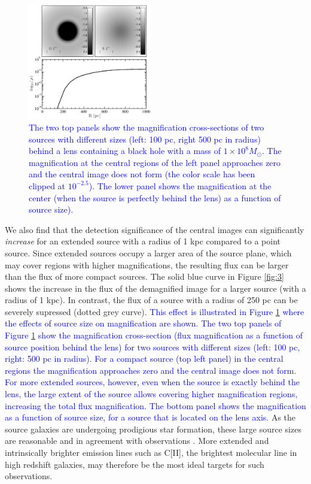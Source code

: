 \documentclass[chicago]{emulateapj}
\newcommand{\blue}{\textcolor{blue}}
\begin{document}
\begin{figure}
\begin{center}
\centering
\includegraphics[trim= 0 0 0 0, clip, width=0.48\textwidth]{figures/f_06.eps}
\centering
\end{center}
\vspace{-1mm}
\caption{\blue{The two top panels show the magnification cross-sections of two sources with different sizes (left: 100 pc, right 500 pc in radius) behind a lens containing a black hole with a mass of $1\times 10^8 M_{\odot}$. The magnification at the central regions of the left panel approaches zero and the central image does not form (the color scale has been clipped at $10^{-2.5}$). The lower panel shows the magnification at the center (when the source is perfectly behind the lens) as a function of source size).}
\label{figMu}}
\vspace{-1.5mm}
\end{figure}


We also find that the detection significance of the central images can significantly \emph{increase} for an extended source with a radius of 1 kpc compared to a point source. Since extended sources occupy a larger area of the source plane, which may cover regions with higher magnifications, the resulting flux can be larger than the flux of more compact sources. 
The solid blue curve in Figure \ref{fig:3} shows the increase in the flux of the demagnified image for a larger source (with a radius of 1 kpc). In contrast, the flux of a source with a radius of 250 pc can be severely supressed (dotted grey curve). 
\blue{This effect is illustrated in Figure \ref{figMu} where the effects of source size on magnification are shown. The two top panels of Figure \ref{figMu} show the magnification cross-section (flux magnification as a function of source position behind the lens) for two sources with different sizes (left: 100 pc, right: 500 pc in radius). For a compact source (top left panel) in the central regions the magnification approaches zero and the central image does not form. For more extended sources, however, even when the source is exactly behind the lens, the large extent of the source allows covering higher magnification regions, increasing the total flux magnification.
The bottom panel shows the magnification as a function of source size, for a source that is located on the lens axis.}
As the source galaxies are undergoing prodigious star formation, these large source sizes are reasonable and in agreement with observations \citep{hezaveh:13b}.
More extended and intrinsically brighter emission lines such as C[II], the brightest molecular line in high redshift galaxies, may therefore be the most ideal targets for such observations.
\end{document}
